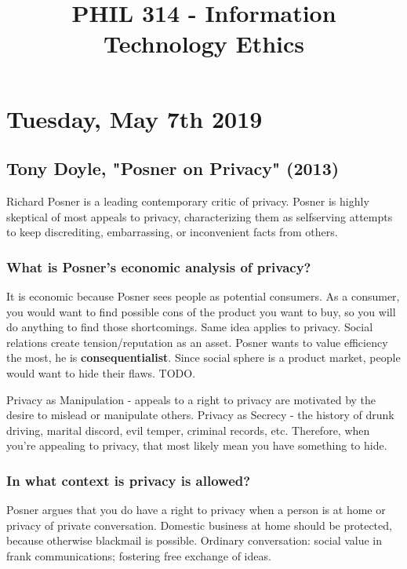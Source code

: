 \documentclass{article}
\title{PHIL 314 - Information Technology Ethics}
\begin{document}
\maketitle
\tableofcontents
\newpage

\section{Tuesday, May 7th 2019}


\subsection{Tony Doyle, "Posner on Privacy" (2013)}

Richard Posner is a leading contemporary critic of privacy. Posner
is highly skeptical of most appeals to privacy, characterizing them as selfserving
attempts to keep discrediting, embarrassing, or inconvenient facts
from others.

\subsubsection{What is Posner's economic analysis of privacy?}

It is economic because Posner sees people as potential consumers. As a consumer, you would want to find possible cons of the product you want to buy, so you will do anything to find those shortcomings. Same idea applies to privacy. Social relations create tension/reputation as an asset. Posner wants to value efficiency the most, he is \textbf{consequentialist}. Since social sphere is a product market, people would want to hide their flaws. TODO.

Privacy as Manipulation - appeals to a right to privacy are motivated by the desire to mislead or manipulate others. Privacy as Secrecy - the history of drunk driving, marital discord, evil temper, criminal records, etc. Therefore, when you're appealing to privacy, that most likely mean you have something to hide.

\subsubsection{In what context is privacy is allowed?}

Posner argues that you do have a right to privacy when a person is at home or privacy of private conversation. Domestic business at home should be protected, because otherwise blackmail is possible. Ordinary conversation: social value in frank communications; fostering free exchange of ideas.
\end{document}
